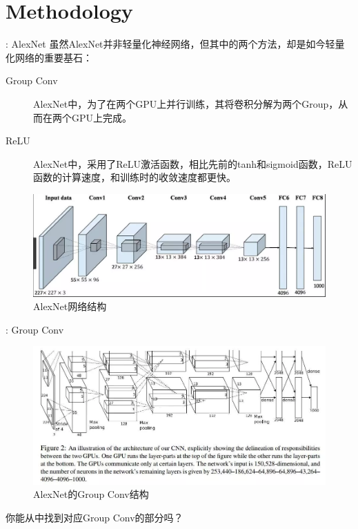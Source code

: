 \section{Methodology}

\begin{frame}{\titleprefix: AlexNet}
	虽然AlexNet并非轻量化神经网络，但其中的两个方法，却是如今轻量化网络的重要基石：
	\begin{description}
		\item[Group Conv] AlexNet中，为了在两个GPU上并行训练，其将卷积分解为两个Group，从而在两个GPU上完成。
		\item[ReLU] AlexNet中，采用了ReLU激活函数，相比先前的tanh和sigmoid函数，ReLU函数的计算速度，和训练时的收敛速度都更快。
	\end{description}
\begin{figure}
	\centering
	\includegraphics[width=0.7\linewidth]{Images/alexnet_1}
	\caption{AlexNet网络结构}
	\label{fig:alexnet1}
\end{figure}

\end{frame}

\begin{frame}{\titleprefix: Group Conv}
	\begin{figure}
		\centering
		\includegraphics[width=0.9\linewidth]{Images/groupconv_1}
		\caption{AlexNet的Group Conv结构}
		\label{fig:groupconv1}
	\end{figure}
你能从中找到对应Group Conv的部分吗？
\end{frame}

